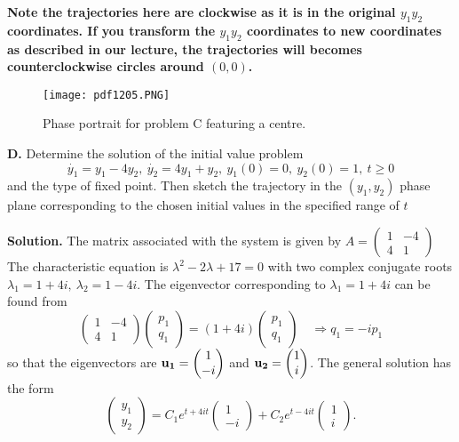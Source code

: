 \documentclass[11pt,a4paper]{article}
\begin{document}
	\textbf{Note the trajectories here are clockwise as it is in the original $y_1y_2$ coordinates. If you transform the $y_1y_2$ coordinates to new coordinates as described in our lecture, the trajectories will becomes counterclockwise circles around $(0, 0)$.}
	\begin{figure}[H]
		\centering
			\texttt{[image: pdf1205.PNG]}
			\caption{Phase portrait for problem C featuring a centre.}
	\end{figure}
	\textbf{D.} Determine the solution of the initial value problem
	$$
	\dot{y_1} = y_1-4y_2,\ \dot{y_2} = 4y_1+y_2,\ y_1(0) = 0,\ y_2(0) = 1,\ t \geq 0
	$$
	and the type of fixed point. Then sketch the trajectory in the $(y_1, y_2)$ phase plane corresponding to the chosen initial values in the specified range of $t$\par
	\textbf{Solution.} The matrix associated with the system is given by
	$
	A
	=
	\begin{pmatrix}
		1 & -4\\
		4 & 1
	\end{pmatrix}
	$
	The characteristic equation is $\lambda^2 - 2\lambda +17=0$ with two complex conjugate roots $\lambda_1 = 1+4i,\ \lambda_2 = 1-4i$. The eigenvector corresponding to $\lambda_1 = 1+4i$ can be found from
	$$
	\begin{pmatrix}
		1 & -4\\
		4 & 1
	\end{pmatrix}
	\begin{pmatrix}
		p_1\\
		q_1
	\end{pmatrix}
	=
	(1+4i)
	\begin{pmatrix}
		p_1\\
		q_1
	\end{pmatrix}\quad
	\Rightarrow
	q_1 = -ip_1
	$$
	so that the eigenvectors are
	$
	\vb{u_1}
	=
	\begin{pmatrix}
		1\\
		-i
	\end{pmatrix}
	$
	and
	$
	\vb{u_2}
	=
	\begin{pmatrix}
		1\\
		i
	\end{pmatrix}
	$.
	The general solution has the form
	$$
	\begin{pmatrix}
		y_1\\
		y_2
	\end{pmatrix}
	=
	C_1e^{t+4it}
	\begin{pmatrix}
		1\\
		-i
	\end{pmatrix}
	+ C_2e^{t-4it}
	\begin{pmatrix}
		1\\
		i
	\end{pmatrix}.
	$$
\end{document}
